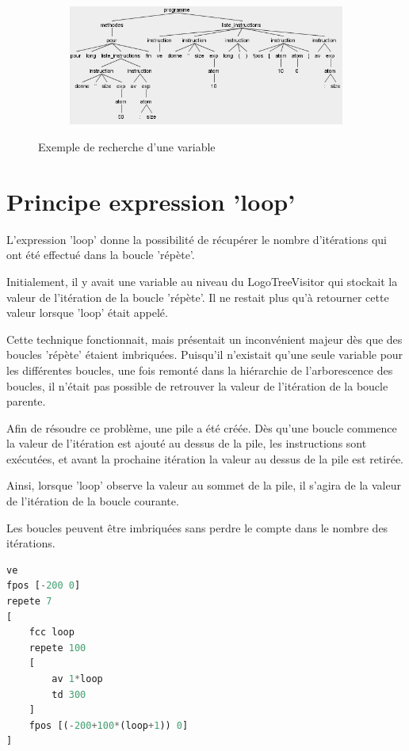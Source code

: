 \documentclass[a4paper,11pt]{article}
\begin{document}
\begin{figure}[!h]
\begin{subfigure}[t]{.15\textwidth}
	\end{subfigure}
	~
	\begin{subfigure}[t]{0.7\textwidth}
		\includegraphics[width=\textwidth]{img/var_tree}
	\end{subfigure}
	\caption{Exemple de recherche d'une variable}
\end{figure}

\section{Principe expression 'loop'}
L'expression 'loop' donne la possibilité de récupérer le nombre d'itérations qui ont été effectué dans la boucle 'répète'. 

Initialement, il y avait une variable au niveau du LogoTreeVisitor qui stockait la valeur de l'itération de la boucle 'répète'. Il ne restait plus qu'à retourner cette valeur lorsque 'loop' était appelé.

Cette technique fonctionnait, mais présentait un inconvénient majeur dès que des boucles 'répète' étaient imbriquées. Puisqu'il n'existait qu'une seule variable pour les différentes boucles, une fois remonté dans la hiérarchie de l'arborescence des boucles, il n'était pas possible de retrouver la valeur de l'itération de la boucle parente. 

Afin de résoudre ce problème, une pile a été créée. Dès qu'une boucle commence la valeur de l'itération est ajouté au dessus de la pile, les instructions sont exécutées, et avant la prochaine itération la valeur au dessus de la pile est retirée. 

Ainsi, lorsque 'loop' observe la valeur au sommet de la pile, il s'agira de la valeur de l'itération de la boucle courante.

Les boucles peuvent être imbriquées sans perdre le compte dans le nombre des itérations. 
\begin{lstlisting}[language=Python]
ve
fpos [-200 0]
repete 7
[
	fcc loop
	repete 100
	[
		av 1*loop
		td 300
	]
	fpos [(-200+100*(loop+1)) 0]	
]
\end{lstlisting}
\end{document}
